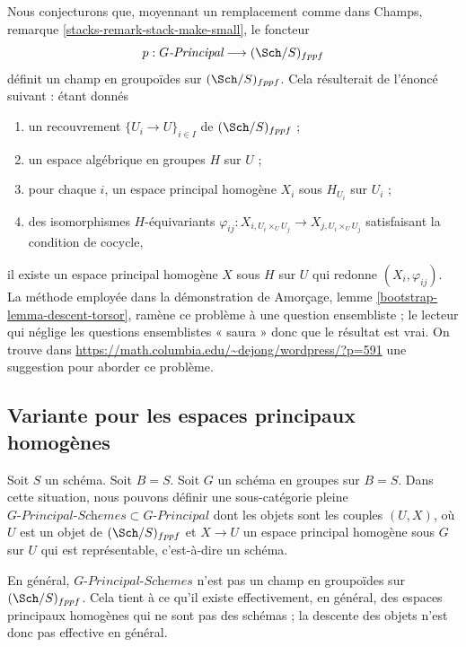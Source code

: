 \begin{remark}
\label{remark-principal-stack-in-groupoids}
Nous conjecturons que, moyennant un remplacement comme dans
Champs, remarque \ref{stacks-remark-stack-make-small},
le foncteur
$$
p : G\textit{-Principal} \longrightarrow (\Sch/S)_{fppf}
$$
définit un champ en groupoïdes sur $(\Sch/S)_{fppf}$. Cela résulterait
de l'énoncé suivant : étant donnés
\begin{enumerate}
\item un recouvrement $\{U_i \to U\}_{i \in I}$ de $(\Sch/S)_{fppf}$ ;
\item un espace algébrique en groupes $H$ sur $U$ ;
\item pour chaque $i$, un espace principal homogène $X_i$ sous $H_{U_i}$
sur $U_i$ ;
\item des isomorphismes $H$-équivariants
$\varphi_{ij} : X_{i, U_i \times_U U_j} \to X_{j, U_i \times_U U_j}$
satisfaisant la condition de cocycle,
\end{enumerate}
il existe un espace principal homogène $X$ sous $H$ sur $U$
qui redonne $(X_i, \varphi_{ij})$. La méthode employée dans la démonstration de
Amorçage, lemme \ref{bootstrap-lemma-descent-torsor},
ramène ce problème à une question ensembliste ; le lecteur qui néglige
les questions ensemblistes « saura » donc que le résultat est vrai. On trouve dans
\url{https://math.columbia.edu/~dejong/wordpress/?p=591}
une suggestion pour aborder ce problème.
\end{remark}



\subsection{Variante pour les espaces principaux homogènes}
\label{subsection-variant-principal-homogeneous-spaces}

\noindent
Soit $S$ un schéma. Soit $B = S$.
Soit $G$ un schéma en groupes sur $B = S$.
Dans cette situation, nous pouvons définir une sous-catégorie pleine
$G\textit{-Principal-Schemes} \subset G\textit{-Principal}$
dont les objets sont les couples $(U, X)$, où $U$ est un objet de
$(\Sch/S)_{fppf}$ et $X \to U$ un espace principal homogène
sous $G$ sur $U$ qui est représentable, c'est-à-dire un schéma.

\medskip\noindent
En général, $G\textit{-Principal-Schemes}$ n'est pas
un champ en groupoïdes sur $(\Sch/S)_{fppf}$. Cela tient
à ce qu'il existe effectivement, en général, des espaces principaux homogènes
qui ne sont pas des schémas ; la descente des objets n'est donc pas effective
en général.



